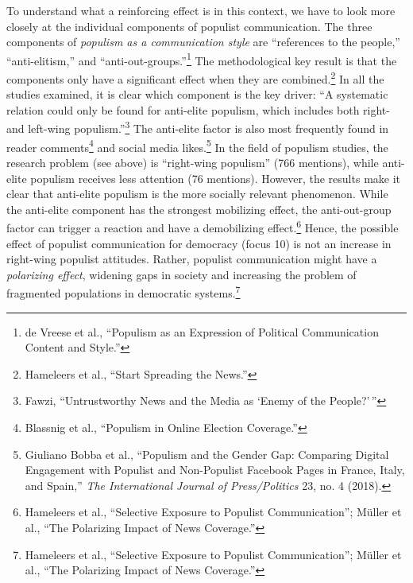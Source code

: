 \documentclass{tufte-handout}
\begin{document}
{{To understand what a reinforcing effect is in this context, we have to
look more closely at the individual components of populist
communication. The three components of \emph{populism as a communication
style} are ``references to the people,'' ``anti-elitism,'' and
``anti-out-groups.''\footnote{de Vreese et al., ``Populism as an
  Expression of Political Communication Content and Style.''} The
methodological key result is that the components only have a significant
effect when they are combined.\footnote{Hameleers et al., ``Start
  Spreading the News.''} In all the studies examined, it is clear which
component is the key driver: ``A systematic relation could only be found
for anti-elite populism, which includes both right- and left-wing
populism.''\footnote{Fawzi, ``Untrustworthy News and the Media as `Enemy
  of the People?'\,''} The anti-elite factor is also most frequently
found in reader comments\footnote{Blassnig et al., ``Populism in Online
  Election Coverage.''} and social media likes.\footnote{Giuliano Bobba
  et al., ``Populism and the Gender Gap: Comparing Digital Engagement
  with Populist and Non-Populist Facebook Pages in France, Italy, and
  Spain,'' \emph{The International Journal of Press/Politics} 23, no. 4
  (2018).} In the field of populism studies, the research problem (see
above) is ``right-wing populism'' (766 mentions), while anti-elite
populism receives less attention (76 mentions). However, the results
make it clear that anti-elite populism is the more socially relevant
phenomenon. While the anti-elite component has the strongest mobilizing
effect, the anti-out-group factor can trigger a reaction and have a
demobilizing effect.\footnote{Hameleers et al., ``Selective Exposure to
  Populist Communication''; Müller et al., ``The Polarizing Impact of
  News Coverage.''} Hence, the possible effect of populist communication
for democracy (focus 10) is not an increase in right-wing populist
attitudes. Rather, populist communication might have a \emph{polarizing
effect}, widening gaps in society and increasing the problem of
fragmented populations in democratic systems.\footnote{Hameleers et al.,
  ``Selective Exposure to Populist Communication''; Müller et al., ``The
  Polarizing Impact of News Coverage.''}

}}
\end{document}
